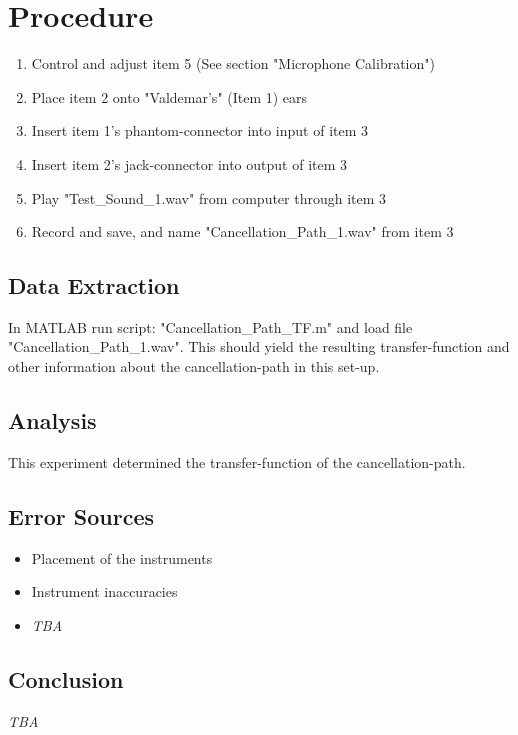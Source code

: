 \section{Procedure}
\begin{enumerate}
	\item Control and adjust item 5 (See section "Microphone Calibration")
	\item Place item 2 onto "Valdemar's" (Item 1) ears
	\item Insert item 1's phantom-connector into input of item 3
	\item Insert item 2's jack-connector into output of item 3
	\item Play "Test\_Sound\_1.wav" from computer through item 3
	\item Record and save, and name "Cancellation\_Path\_1.wav" from item 3
\end{enumerate}

\subsection{Data Extraction}
In MATLAB\textsuperscript{\textregistered} run script: "Cancellation\_Path\_TF.m" and load file "Cancellation\_Path\_1.wav". This should yield the resulting transfer-function and other information about the cancellation-path in this set-up.

\subsection{Analysis}
This experiment determined the transfer-function of the cancellation-path.

\subsection{Error Sources}
\begin{itemize}
	\item Placement of the instruments
	\item Instrument inaccuracies 
	\item \textit{TBA}
\end{itemize}

\subsection{Conclusion}
\textit{TBA}